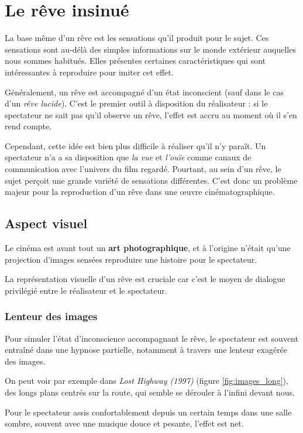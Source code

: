 \documentclass[../main.tex]{subfile}
\begin{document}
\section{Le rêve insinué}

La base même d'un rêve est les sensations qu'il produit pour le sujet. Ces
sensations sont au-délà des simples informations sur le monde extérieur
auquelles nous sommes habitués. Elles présentes certaines caractéristiques qui
sont intéressantes à reproduire pour imiter cet effet.

Généralement, un rêve est accompagné d'un état inconscient (sauf dans le cas
d'un \emph{rêve lucide}). C'est le premier outil à disposition du réalisateur :
si le spectateur ne sait pas qu'il observe un rêve, l'effet est accru au moment
où il s'en rend compte.

Cependant, cette idée est bien plus difficile à réaliser qu'il n'y paraît. Un
spectateur n'a a sa disposition que \emph{la vue} et \emph{l'ouïe} comme canaux
de communication avec l'univers du film regardé. Pourtant, au sein d'un rêve,
le sujet perçoit une grande variété de sensations différentes. C'est donc un
problème majeur pour la reproduction d'un rêve dans une \oe{}uvre
cinématographique.

\subsection{Aspect visuel}

Le cinéma est avant tout un \textbf{art photographique}, et à l'origine n'était
qu'une projection d'images sensées reproduire une histoire pour le spectateur.

La représentation visuelle d'un rêve est cruciale car c'est le moyen de
dialogue privilégié entre le réalisateur et le spectateur.

\subsubsection{Lenteur des images}
\label{sec:lenteur}

Pour simuler l'état d'inconscience accompagnant le rêve, le spectateur est
souvent entraîné dans une hypnose partielle, notamment à travers une lenteur
exagérée des images.

On peut voir par exemple dans \textit{Lost Highway (1997)} (figure
\ref{fig:images_long}), des longs plans centrés sur la route, qui semble se
dérouler à l'infini devant nous.

Pour le spectateur assis confortablement depuis un certain temps dans une salle
sombre, souvent avec une musique douce et pesante, l'effet est net.
\end{document}
